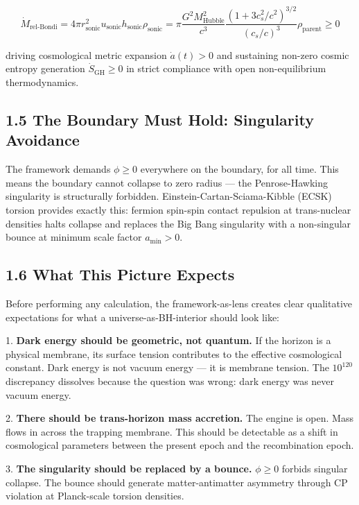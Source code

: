 \documentclass[11pt,a4paper]{article}
\theoremstyle{definition}\newtheorem{definition}{Definition}
\theoremstyle{remark}\newtheorem{remark}{Remark}
\begin{document}
\begin{equation}
\boxed{\dot{M}_{\text{rel-Bondi}} = 4\pi r_{\text{sonic}}^2 u_{\text{sonic}} h_{\text{sonic}} \rho_{\text{sonic}} = \pi \frac{G^2 M_{\text{Hubble}}^2}{c^3} \frac{\left( 1 + 3 c_s^2/c^2 \right)^{3/2}}{(c_s/c)^3} \rho_{\text{parent}} \ge 0}
\end{equation}


driving cosmological metric expansion $\dot{a}(t) > 0$ and sustaining non-zero cosmic entropy generation $\dot{S}_{\text{GH}} \ge 0$ in strict compliance with open non-equilibrium thermodynamics.
\subsection{1.5 The Boundary Must Hold: Singularity Avoidance}

The framework demands $\phi \ge 0$ everywhere on the boundary, for all time. This means the boundary cannot collapse to zero radius — the Penrose-Hawking singularity is structurally forbidden. Einstein-Cartan-Sciama-Kibble (ECSK) torsion provides exactly this: fermion spin-spin contact repulsion at trans-nuclear densities halts collapse and replaces the Big Bang singularity with a non-singular bounce at minimum scale factor $a_{\text{min}} > 0$.
\subsection{1.6 What This Picture Expects}

Before performing any calculation, the framework-as-lens creates clear qualitative expectations for what a universe-as-BH-interior should look like:

1. \textbf{Dark energy should be geometric, not quantum.} If the horizon is a physical membrane, its surface tension contributes to the effective cosmological constant. Dark energy is not vacuum energy — it is membrane tension. The $10^{120}$ discrepancy dissolves because the question was wrong: dark energy was never vacuum energy.

2. \textbf{There should be trans-horizon mass accretion.} The engine is open. Mass flows in across the trapping membrane. This should be detectable as a shift in cosmological parameters between the present epoch and the recombination epoch.

3. \textbf{The singularity should be replaced by a bounce.} $\phi \ge 0$ forbids singular collapse. The bounce should generate matter-antimatter asymmetry through CP violation at Planck-scale torsion densities.
\end{document}
